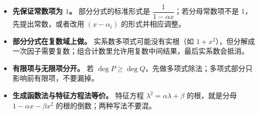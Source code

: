 \begin{itemize}
\item \textbf{先保证常数项为 $1$。} 部分分式的标准形式是 $\dfrac{1}{1-\alpha x}$；若分母常数项不是 $1$，先提出常数，或者改用 $(x-\alpha_i)$ 的形式并相应调整。
\item \textbf{部分分式在复数域上做。} 实系数多项式可能没有实根（如 $1+x^2$），但分解成一次因子需要复数；组合计数里允许用复数中间结果，最后实系数会抵消。
\item \textbf{有限项与无限项分开。} 若 $\deg P\ge\deg Q$，先做多项式除法；多项式部分只影响前有限项，不要漏掉。
\item \textbf{生成函数法与特征方程法等价。} 特征方程 $\lambda^2=\alpha\lambda+\beta$ 的根，就是分母 $1-\alpha x-\beta x^2$ 的根的倒数；两种写法不要混。
\end{itemize}
